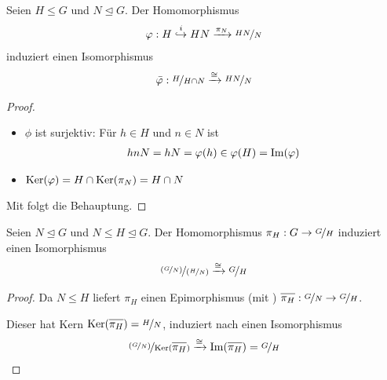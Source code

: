 \begin{conclusion}[1. Homomorphiesatz]
	Seien $H\le G$ und $N\unlhd G$. Der Homomorphismus
	\begin{align}
		\varphi: H\overset{i}{\hookrightarrow} HN\xrightarrow{\pi_N}\nicefrac{HN}{N}\notag
	\end{align}
	induziert einen Isomorphismus
	\begin{align}
		\overline{\phi}:\lnkset{H}{H\cap N}\xrightarrow{\cong}\lnkset{HN}{N}\notag
	\end{align}
\end{conclusion}
\begin{proof}
	\begin{itemize}
		\item $\phi$ ist surjektiv: Für $h\in H$ und $n\in N$ ist
		\begin{align}
			hnN=hN=\varphi(h)\in\varphi(H)=\operatorname{Im}(\varphi)\notag
		\end{align}
		\item $\operatorname{Ker}(\varphi)=H\cap\operatorname{Ker}(\pi_N)=H\cap N$
	\end{itemize}
	Mit  folgt die Behauptung.
\end{proof}

\begin{conclusion}[2. Homomorphiesatz]
	Seien $N\unlhd G$ und $N\le H\unlhd G$. Der Homomorphismus $\pi_H:G\to\nicefrac{G}{H}$ induziert einen Isomorphismus
	\begin{align}
		\nicefrac{(\nicefrac{G}{N})}{(\nicefrac{H}{N})}\xrightarrow{\cong}\nicefrac{G}{H}\notag
	\end{align}
\end{conclusion}
\begin{proof}
	Da $N\le H$ liefert $\pi_H$ einen Epimorphismus (mit ) $\overline{\pi_H}:\lnkset{G}{N}\to \lnkset{G}{H}$.
	\begin{center}
	\end{center}
	Dieser hat Kern $\Ker(\overline{\pi_H})=\lnkset{H}{N}$, induziert nach  einen Isomorphismus %
	\begin{align}
		\lnkset{(\lnkset{G}{N})}{\Ker(\overline{\pi_H})}\xrightarrow{\cong}\Image(\overline{\pi_H})=\lnkset{G}{H}\notag
	\end{align}
\end{proof}

